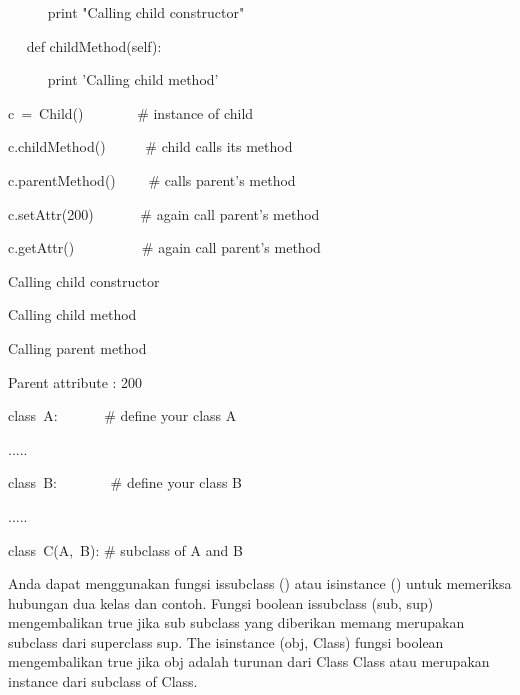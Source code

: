 {\noindent 
~~~~~ print "Calling child constructor" \par
\vspace{12pt}
\noindent 
~~ def childMethod(self): \par
\noindent 
~~~~~ print 'Calling child method' \par
\vspace{12pt}
\noindent 
c~=~Child()~~~~~~~    $  \#  $ instance of child \par
\noindent 
c.childMethod()~~~~~  $  \#  $ child calls its method \par
\noindent 
c.parentMethod()~~~~  $  \#  $ calls parent's method \par
\noindent 
c.setAttr(200)~~~~~~  $  \#  $ again call parent's method \par
\noindent 
c.getAttr()~~~~~~~~~  $  \#  $ again call parent's method \par
\vspace{12pt}
\noindent 
Calling child constructor \par
\noindent 
Calling child method \par
\noindent 
Calling parent method \par
\noindent 
Parent attribute : 200 \par
\vspace{12pt}
\noindent 
class~A:~~~~~~   $  \#  $ define your class A \par
\noindent 
..... \par
\vspace{12pt}
\noindent 
class~B:~~~~~~~   $  \#  $ define your class B \par
\noindent 
..... \par
\vspace{12pt}
\noindent 
class~C(A,~B):    $  \#  $ subclass of A and B \par
\vspace{12pt}

Anda dapat menggunakan fungsi issubclass () atau isinstance () untuk memeriksa hubungan dua kelas dan contoh. Fungsi boolean issubclass (sub, sup) mengembalikan true jika sub subclass yang diberikan memang merupakan subclass dari superclass sup. The isinstance (obj, Class) fungsi boolean mengembalikan true jika obj adalah turunan dari Class Class atau merupakan instance dari subclass of Class. \par
\vspace{12pt}
\noindent 

}
